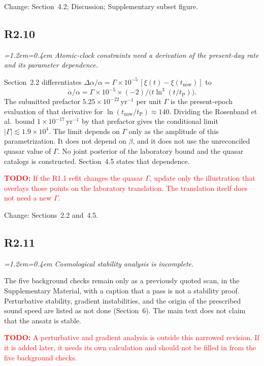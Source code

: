 \documentclass[11pt,a4paper]{article}
\newenvironment{review}{\par\color{revcolor}\itshape\leftskip=1.2em\rightskip=0.4em\noindent}{\par\leftskip=0pt\rightskip=0pt}
\newcommand{\revtodo}[1]{\textcolor{red}{\textbf{TODO:} #1}}
\begin{document}
Change: Section~4.2; Discussion; Supplementary subset figure.

\subsection*{R2.10}
\begin{review}
Atomic-clock constraints need a derivation of the present-day rate and its parameter dependence.
\end{review}

Section~2.2 differentiates $\Delta\alpha/\alpha = \Gamma\times 10^{-5}\,[\xi(t)-\xi(t_{\mathrm{now}})]$ to
\[
  \dot\alpha/\alpha = \Gamma\times 10^{-5}\times(-2)/\big(t\ln^3(t/t_{\mathrm{P}})\big).
\]
The submitted prefactor $5.25\times 10^{-22}\,\mathrm{yr}^{-1}$ per unit $\Gamma$ is the present-epoch evaluation of that derivative for $\ln(t_{\mathrm{now}}/t_{\mathrm{P}})\approx 140$.
Dividing the Rosenband et al.\ bound $1\times 10^{-17}\,\mathrm{yr}^{-1}$ by that prefactor gives the conditional limit $|\Gamma|\lesssim 1.9\times 10^{4}$.
The limit depends on $\Gamma$ only as the amplitude of this parametrization.
It does not depend on $\beta$, and it does not use the unreconciled quasar value of $\Gamma$.
No joint posterior of the laboratory bound and the quasar catalogs is constructed.
Section~4.5 states that dependence.

\revtodo{If the R1.1 refit changes the quasar $\Gamma$, update only the illustration that overlays those points on the laboratory translation. The translation itself does not need a new $\Gamma$.}

Change: Sections~2.2 and~4.5.

\subsection*{R2.11}
\begin{review}
Cosmological stability analysis is incomplete.
\end{review}

The five background checks remain only as a previously quoted scan, in the Supplementary Material, with a caption that a pass is not a stability proof.
Perturbative stability, gradient instabilities, and the origin of the prescribed sound speed are listed as not done (Section~6).
The main text does not claim that the ansatz is stable.

\revtodo{A perturbative and gradient analysis is outside this narrowed revision. If it is added later, it needs its own calculation and should not be filled in from the five background checks.}
\end{document}
